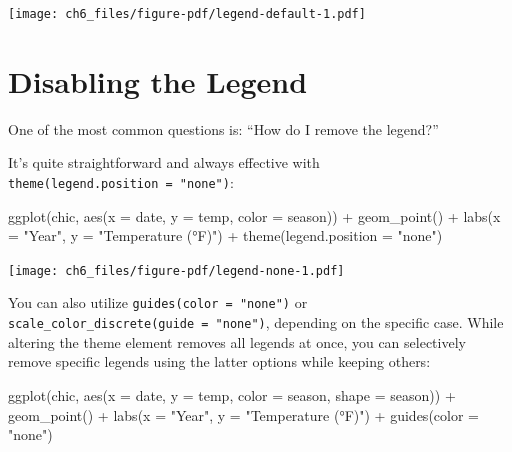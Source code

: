 \documentclass[
  letterpaper,
]{scrbook}
\newenvironment{Shaded}{\begin{snugshade}}{\end{snugshade}}
\newcommand{\AttributeTok}[1]{\textcolor[rgb]{0.40,0.45,0.13}{#1}}
\newcommand{\FunctionTok}[1]{\textcolor[rgb]{0.28,0.35,0.67}{#1}}
\newcommand{\NormalTok}[1]{\textcolor[rgb]{0.00,0.23,0.31}{#1}}
\newcommand{\SpecialCharTok}[1]{\textcolor[rgb]{0.37,0.37,0.37}{#1}}
\newcommand{\StringTok}[1]{\textcolor[rgb]{0.13,0.47,0.30}{#1}}
\begin{document}
\texttt{[image: ch6\_files/figure-pdf/legend-default-1.pdf]}

\section{Disabling the Legend}\label{disabling-the-legend}

One of the most common questions is: ``How do I remove the legend?''

It's quite straightforward and always effective with
\texttt{theme(legend.position\ =\ "none")}:

\begin{Shaded}
\begin{Highlighting}[]
\FunctionTok{ggplot}\NormalTok{(chic,}
       \FunctionTok{aes}\NormalTok{(}\AttributeTok{x =}\NormalTok{ date, }\AttributeTok{y =}\NormalTok{ temp, }\AttributeTok{color =}\NormalTok{ season)) }\SpecialCharTok{+}
  \FunctionTok{geom\_point}\NormalTok{() }\SpecialCharTok{+}
  \FunctionTok{labs}\NormalTok{(}\AttributeTok{x =} \StringTok{"Year"}\NormalTok{, }\AttributeTok{y =} \StringTok{"Temperature (°F)"}\NormalTok{) }\SpecialCharTok{+}
  \FunctionTok{theme}\NormalTok{(}\AttributeTok{legend.position =} \StringTok{"none"}\NormalTok{)}
\end{Highlighting}
\end{Shaded}

\texttt{[image: ch6\_files/figure-pdf/legend-none-1.pdf]}

You can also utilize \texttt{guides(color\ =\ "none")} or
\texttt{scale\_color\_discrete(guide\ =\ "none")}, depending on the
specific case. While altering the theme element removes all legends at
once, you can selectively remove specific legends using the latter
options while keeping others:

\begin{Shaded}
\begin{Highlighting}[]
\FunctionTok{ggplot}\NormalTok{(chic,}
       \FunctionTok{aes}\NormalTok{(}\AttributeTok{x =}\NormalTok{ date, }\AttributeTok{y =}\NormalTok{ temp,}
           \AttributeTok{color =}\NormalTok{ season, }\AttributeTok{shape =}\NormalTok{ season)) }\SpecialCharTok{+}
  \FunctionTok{geom\_point}\NormalTok{() }\SpecialCharTok{+}
  \FunctionTok{labs}\NormalTok{(}\AttributeTok{x =} \StringTok{"Year"}\NormalTok{, }\AttributeTok{y =} \StringTok{"Temperature (°F)"}\NormalTok{) }\SpecialCharTok{+}
  \FunctionTok{guides}\NormalTok{(}\AttributeTok{color =} \StringTok{"none"}\NormalTok{)}
\end{Highlighting}
\end{Shaded}
\end{document}
